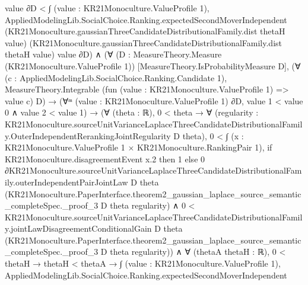 \documentclass[10pt]{article}
\begin{document}
\begin{ReviewVerbatim}
                                  value ∂D <
                              ∫ (value : KR21Monoculture.ValueProfile 1),
                                AppliedModelingLib.SocialChoice.Ranking.expectedSecondMoverIndependent
                                  (KR21Monoculture.gaussianThreeCandidateDistributionalFamily.dist thetaH value)
                                  (KR21Monoculture.gaussianThreeCandidateDistributionalFamily.dist thetaH value)
                                  value ∂D) ∧
              (∀ (D : MeasureTheory.Measure (KR21Monoculture.ValueProfile 1)) [MeasureTheory.IsProbabilityMeasure D],
                  (∀ (c : AppliedModelingLib.SocialChoice.Ranking.Candidate 1),
                      MeasureTheory.Integrable (fun (value : KR21Monoculture.ValueProfile 1) => value c) D) →
                    (∀ᵐ (value : KR21Monoculture.ValueProfile 1) ∂D, value 1 < value 0 ∧ value 2 < value 1) →
                      (∀ (theta : ℝ),
                          0 < theta →
                            ∀
                              (regularity :
                                KR21Monoculture.sourceUnitVarianceLaplaceThreeCandidateDistributionalFamily.OuterIndependentRerankingJointRegularity
                                  D theta),
                              0 <
                                  ∫ (x : KR21Monoculture.ValueProfile 1 × KR21Monoculture.RankingPair 1),
                                    if KR21Monoculture.disagreementEvent x.2 then 1
                                    else
                                      0 ∂KR21Monoculture.sourceUnitVarianceLaplaceThreeCandidateDistributionalFamily.outerIndependentPairJointLaw
                                      D theta
                                      (KR21Monoculture.PaperInterface.theorem2_gaussian_laplace_source_semantic_completeSpec._proof_3
                                        D theta regularity) ∧
                                0 <
                                  KR21Monoculture.sourceUnitVarianceLaplaceThreeCandidateDistributionalFamily.jointLawDisagreementConditionalGain
                                    D theta
                                    (KR21Monoculture.PaperInterface.theorem2_gaussian_laplace_source_semantic_completeSpec._proof_3
                                      D theta regularity)) ∧
                        ∀ (thetaA thetaH : ℝ),
                          0 < thetaH →
                            thetaH < thetaA →
                              ∫ (value : KR21Monoculture.ValueProfile 1),
                                  AppliedModelingLib.SocialChoice.Ranking.expectedSecondMoverIndependent

\end{ReviewVerbatim}
\end{document}
